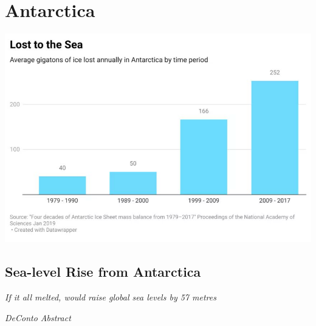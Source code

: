 \documentclass[
]{book}
\begin{document}
\hypertarget{antarctica}{%
\section{Antarctica}\label{antarctica}}

\includegraphics{fig/Antarctica_Ice_Loss_to_Sea.jpeg}

\hypertarget{sea-level-rise-from-antarctica}{%
\subsection{Sea-level Rise from Antarctica}\label{sea-level-rise-from-antarctica}}

\emph{If it all melted, would raise global sea levels by 57 metres}

\emph{DeConto Abstract}
\end{document}
